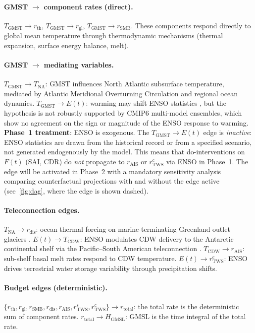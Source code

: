 \documentclass[11pt]{article}
\newcommand{\GMSL}{\text{GMSL}}
\newcommand{\GMST}{\text{GMST}}
\newcommand{\CDW}{\text{CDW}}
\begin{document}
\paragraph{GMST $\to$ component rates (direct).}
$T_{\GMST} \to r_{\text{th}}$, $T_{\GMST} \to r_{\text{gl}}$, $T_{\GMST} \to r_{\text{SMB}}$.  These components respond directly to global mean temperature through thermodynamic mechanisms (thermal expansion, surface energy balance, melt).

\paragraph{GMST $\to$ mediating variables.}
$T_{\GMST} \to T_{\text{NA}}$: GMST influences North Atlantic subsurface temperature, mediated by Atlantic Meridional Overturning Circulation and regional ocean dynamics.  $T_{\GMST} \to E(t)$: warming may shift ENSO statistics \citep{cai2014increasing}, but the hypothesis is not robustly supported by CMIP6 multi-model ensembles, which show no agreement on the sign or magnitude of the ENSO response to warming.  \textbf{Phase~1 treatment}: ENSO is exogenous.  The $T_{\GMST} \to E(t)$ edge is \emph{inactive}: ENSO statistics are drawn from the historical record or from a specified scenario, not generated endogenously by the model.  This means that do-interventions on $F(t)$ (SAI, CDR) do \emph{not} propagate to $r_{\text{AIS}}$ or $r_{\text{TWS}}^{\text{c}}$ via ENSO in Phase~1.  The edge will be activated in Phase~2 with a mandatory sensitivity analysis comparing counterfactual projections with and without the edge active (see~\cref{fig:dag}, where the edge is shown dashed).

\paragraph{Teleconnection edges.}
$T_{\text{NA}} \to r_{\text{dis}}$: ocean thermal forcing on marine-terminating Greenland outlet glaciers \citep{straneo2013north}.  $E(t) \to T_{\CDW}$: ENSO modulates CDW delivery to the Antarctic continental shelf via the Pacific--South American teleconnection \citep{steig2012tropical, paolo2018response}.  $T_{\CDW} \to r_{\text{AIS}}$: sub-shelf basal melt rates respond to CDW temperature.  $E(t) \to r_{\text{TWS}}^{\text{c}}$: ENSO drives terrestrial water storage variability through precipitation shifts.

\paragraph{Budget edges (deterministic).}
$\{r_{\text{th}}, r_{\text{gl}}, r_{\text{SMB}}, r_{\text{dis}}, r_{\text{AIS}}, r_{\text{TWS}}^{\text{s}}, r_{\text{TWS}}^{\text{c}}\} \to r_{\text{total}}$: the total rate is the deterministic sum of component rates.  $r_{\text{total}} \to H_{\GMSL}$: GMSL is the time integral of the total rate.
\end{document}

